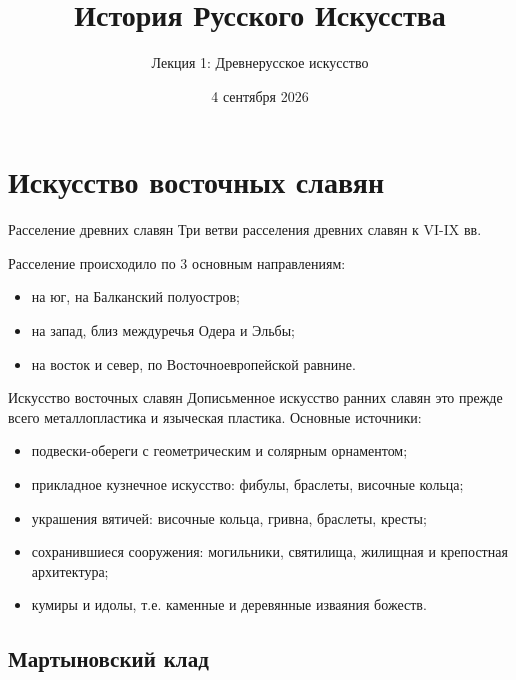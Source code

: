 
{
  \title{История Русского Искусства}
  \subtitle{Лекция 1: Древнерусское искусство}
  \date{4 сентября 2026}

  \begin{frame}
    \titlepage
  \end{frame}
}

\section{Искусство восточных славян}

\begin{frame}{Расселение древних славян}
    {Три ветви расселения древних славян к VI-IX вв.}

  Расселение происходило по 3 основным направлениям:
  \begin{itemize}
    \item на юг, на Балканский полуостров; 
    \item на запад, близ междуречья Одера и Эльбы; 
    \item на восток и север, по Восточноевропейской равнине.
  \end{itemize}
\end{frame}

\begin{frame}{Искусство восточных славян}
  Дописьменное искусство ранних славян это прежде всего металлопластика
  и языческая пластика. Основные источники:
  \begin{itemize}
    \item подвески-обереги с геометрическим и солярным орнаментом;
    \item прикладное кузнечное искусство: фибулы, браслеты, височные кольца;
    \item украшения вятичей: височные кольца, гривна, браслеты, кресты;
    \item сохранившиеся сооружения: могильники, святилища, жилищная и крепостная архитектура;
    \item кумиры и идолы, т.е. каменные и деревянные изваяния божеств.
  \end{itemize}
\end{frame}

\subsection{Мартыновский клад}

